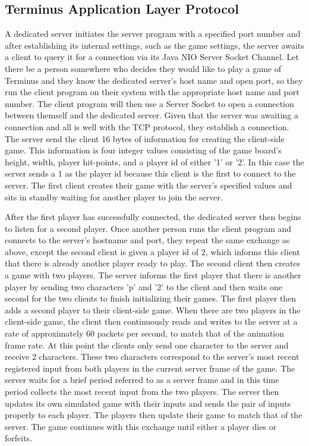 \documentclass[12pt]{article}
\begin{document}
\subsection{Terminus Application Layer Protocol}\label{appLayer}
    A dedicated server initiates the server program with a specified port number and after establishing its internal settings, such as the game settings, the server awaits a client to query it for a connection via its Java NIO Server Socket Channel. Let there be a person somewhere who decides they would like to play a game of Terminus and they know the dedicated server's host name and open port, so they run the client program on their system with the appropriate host name and port number. The client program will then use a Server Socket to open a connection between themself and the dedicated server. Given that the server was awaiting a connection and all is well with the TCP protocol, they establish a connection. The server send the client 16 bytes of information for creating the client-side game. This information is four integer values consisting of the game board's height, width, player hit-points, and a player id of either '1' or '2'. In this case the server sends a 1 as the player id because this client is the first to connect to the server. The first client creates their game with the server's specified values and sits in standby waiting for another player to join the server.
    
    After the first player has successfully connected, the dedicated server then begins to listen for a second player. Once another person runs the client program and connects to the server's hostname and port, they repeat the same exchange as above, except the second client is given a player id of 2, which informs this client that there is already another player ready to play. The second client then creates a game with two players. The server informs the first player that there is another player by sending two characters 'p' and '2' to the client and then waits one second for the two clients to finish initializing their games. The first player then adds a second player to their client-side game. When there are two players in the client-side game, the client then continuously reads and writes to the server at a rate of approximately 60 packets per second, to match that of the animation frame rate. At this point the clients only send one character to the server and receive 2 characters. These two characters correspond to the server's most recent registered input from both players in the current server frame of the game. The server waits for a brief period referred to as a server frame and in this time period collects the most recent input from the two players. The server then updates its own simulated game with their inputs and sends the pair of inputs properly to each player. The players then update their game to match that of the server. The game continues with this exchange until either a player dies or forfeits.
    
\end{document}
